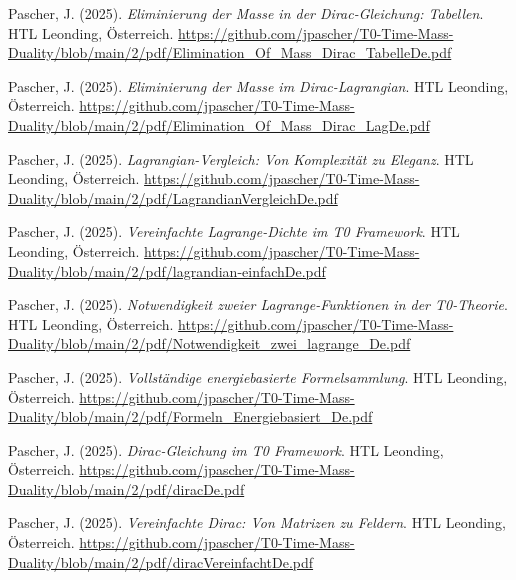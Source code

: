\documentclass{article}
\begin{document}
\begin{thebibliography}{99}
		Pascher, J. (2025).
		\textit{Eliminierung der Masse in der Dirac-Gleichung: Tabellen}.
		HTL Leonding, Österreich.
		\url{https://github.com/jpascher/T0-Time-Mass-Duality/blob/main/2/pdf/Elimination_Of_Mass_Dirac_TabelleDe.pdf}
		
		Pascher, J. (2025).
		\textit{Eliminierung der Masse im Dirac-Lagrangian}.
		HTL Leonding, Österreich.
		\url{https://github.com/jpascher/T0-Time-Mass-Duality/blob/main/2/pdf/Elimination_Of_Mass_Dirac_LagDe.pdf}
		
		
		Pascher, J. (2025).
		\textit{Lagrangian-Vergleich: Von Komplexität zu Eleganz}.
		HTL Leonding, Österreich.
		\url{https://github.com/jpascher/T0-Time-Mass-Duality/blob/main/2/pdf/LagrandianVergleichDe.pdf}
		
		Pascher, J. (2025).
		\textit{Vereinfachte Lagrange-Dichte im T0 Framework}.
		HTL Leonding, Österreich.
		\url{https://github.com/jpascher/T0-Time-Mass-Duality/blob/main/2/pdf/lagrandian-einfachDe.pdf}
		
		Pascher, J. (2025).
		\textit{Notwendigkeit zweier Lagrange-Funktionen in der T0-Theorie}.
		HTL Leonding, Österreich.
		\url{https://github.com/jpascher/T0-Time-Mass-Duality/blob/main/2/pdf/Notwendigkeit_zwei_lagrange_De.pdf}
		
		Pascher, J. (2025).
		\textit{Vollständige energiebasierte Formelsammlung}.
		HTL Leonding, Österreich.
		\url{https://github.com/jpascher/T0-Time-Mass-Duality/blob/main/2/pdf/Formeln_Energiebasiert_De.pdf}
		
		
		Pascher, J. (2025).
		\textit{Dirac-Gleichung im T0 Framework}.
		HTL Leonding, Österreich.
		\url{https://github.com/jpascher/T0-Time-Mass-Duality/blob/main/2/pdf/diracDe.pdf}
		
		Pascher, J. (2025).
		\textit{Vereinfachte Dirac: Von Matrizen zu Feldern}.
		HTL Leonding, Österreich.
		\url{https://github.com/jpascher/T0-Time-Mass-Duality/blob/main/2/pdf/diracVereinfachtDe.pdf}
		

\end{thebibliography}
\end{document}
